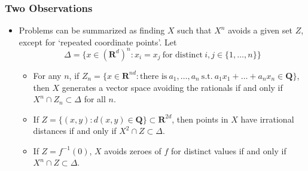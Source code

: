 \documentclass[handout,usenames,dvipsnames]{beamer}
\begin{document}
\begin{frame}
    \frametitle{Two Observations}

    \begin{itemize}
        \item Problems can be summarized as finding $X$ such that $X^n$ avoids a given set $Z$, except for `repeated coordinate points'. Let
        \[ \Delta = \{ x \in (\mathbf{R}^d)^n: x_i = x_j\ \text{for distinct}\ i,j \in \{ 1, \dots, n \} \} \]
        \vspace{-1.5em}


        \begin{itemize}
            \pause
           \item For any $n$, if $Z_n = \{ x \in \mathbf{R}^{nd}: \text{there is}\ a_1, \dots, a_n\ \text{s.t.}\ a_1x_1 + \dots + a_nx_n \in \mathbf{Q} \}$, then $X$ generates a vector space avoiding the rationals if and only if $X^n \cap Z_n \subset \Delta$ for all $n$.

           \pause
            \item If $Z = \{ (x,y): d(x,y) \in \mathbf{Q} \} \subset \mathbf{R}^{2d}$, then points in $X$ have irrational distances if and only if $X^2 \cap Z \subset \Delta$.

            \pause
            \item If $Z = f^{-1}(0)$, $X$ avoids zeroes of $f$ for distinct values if and only if $X^n \cap Z \subset \Delta$.
        \end{itemize}
    \end{itemize}
\end{frame}
\end{document}
